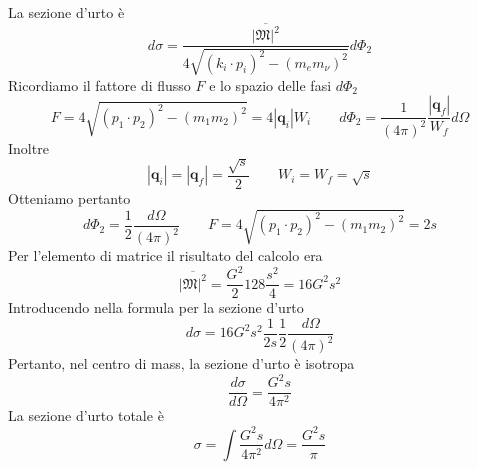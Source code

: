 La sezione d'urto è
$$
d\sigma = \frac{\overline{|\mathfrak{M}|^2}}{4\sqrt{(k_i \cdot p_i)^2 - (m_e m_\nu)^2}} d\Phi_2
$$
Ricordiamo il fattore di flusso $F$ e lo spazio delle fasi $d\Phi_2$
$$
F = 4\sqrt{(p_1 \cdot p_2)^2 - (m_1 m_2)^2} = 4|\mathbf{q}_i|W_i \qquad d\Phi_2 = \frac{1}{(4\pi)^2} \frac{|\mathbf{q}_f|}{W_f} d\Omega
$$
Inoltre
$$
|\mathbf{q}_i| = |\mathbf{q}_f| = \frac{\sqrt{s}}{2} \qquad W_i = W_f = \sqrt{s}
$$
Otteniamo pertanto
$$
d\Phi_2 = \frac{1}{2} \frac{d\Omega}{(4\pi)^2} \qquad F = 4\sqrt{(p_1 \cdot p_2)^2 - (m_1 m_2)^2} = 2s
$$
Per l'elemento di matrice il risultato del calcolo era
$$
\overline{|\mathfrak{M}|^2} = \frac{G^2}{2} 128 \frac{s^2}{4} = 16 G^2 s^2
$$
Introducendo nella formula per la sezione d'urto
$$
d\sigma = 16 G^2 s^2 \frac{1}{2s} \frac{1}{2} \frac{d\Omega}{(4\pi)^2}
$$
Pertanto, nel centro di mass, la sezione d'urto è isotropa
$$
\frac{d\sigma}{d\Omega} = \frac{G^2 s}{4\pi^2}
$$
La sezione d'urto totale è
$$
\sigma = \int \frac{G^2 s}{4\pi^2} d\Omega = \frac{G^2 s}{\pi}
$$
